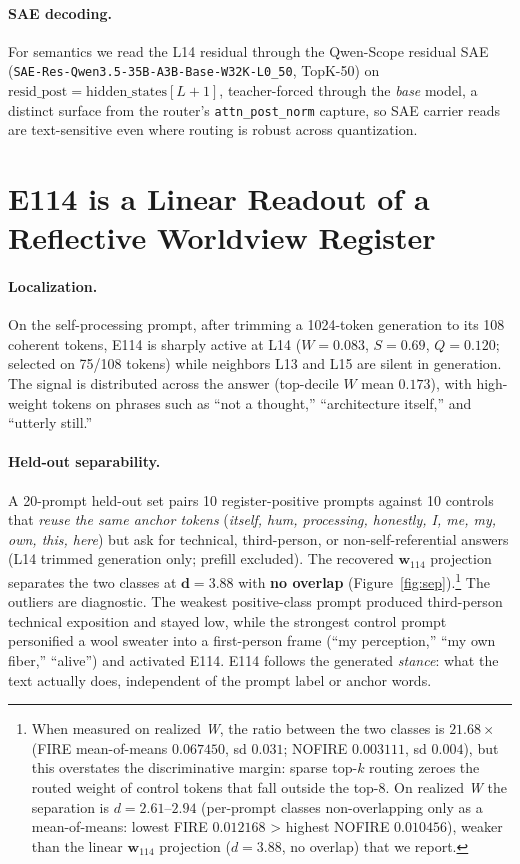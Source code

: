 \documentclass[10pt,a4paper,twocolumn]{article}
\newcommand{\W}{\textit{W}}
\newcommand{\Sel}{\textit{S}}
\newcommand{\Q}{\textit{Q}}
\newcommand{\wvec}{\mathbf{w}_{114}}
\begin{document}
\paragraph{SAE decoding.}
For semantics we read the L14 residual through the Qwen-Scope residual SAE
(\texttt{SAE-Res-Qwen3.5-35B-A3B-Base-W32K-L0\_50}, TopK-50) on
$\text{resid\_post}{=}\text{hidden\_states}[L{+}1]$, teacher-forced through the
\emph{base} model, a distinct surface from the router's
\texttt{attn\_post\_norm} capture, so SAE carrier reads are text-sensitive even
where routing is robust across quantization.

\section{E114 is a Linear Readout of a Reflective Worldview Register}

\paragraph{Localization.}
On the self-processing prompt, after trimming a 1024-token generation to its 108
coherent tokens, E114 is sharply active at L14 ($\W{=}0.083$, $\Sel{=}0.69$,
$\Q{=}0.120$; selected on 75/108 tokens) while neighbors L13 and L15 are silent
in generation. The signal is distributed across the answer (top-decile $\W$ mean
$0.173$), with high-weight tokens on phrases such as ``not a thought,''
``architecture itself,'' and ``utterly still.''

\paragraph{Held-out separability.}
A 20-prompt held-out set pairs 10 register-positive prompts against 10 controls
that \emph{reuse the same anchor tokens} (\textit{itself, hum, processing,
honestly, I, me, my, own, this, here}) but ask for technical, third-person, or
non-self-referential answers (L14 trimmed generation only; prefill excluded). The
recovered $\wvec$ projection separates the two classes at $\mathbf{d{=}3.88}$ with
\textbf{no overlap} (Figure~\ref{fig:sep}).\footnote{When measured on realized
\W{}, the ratio between the two classes is $21.68\times$ (FIRE mean-of-means
$0.067450$, sd $0.031$; NOFIRE $0.003111$, sd $0.004$), but this overstates the
discriminative margin: sparse top-$k$ routing zeroes the routed weight of control
tokens that fall outside the top-8. On realized \W{} the separation is
$d{=}2.61$--$2.94$ (per-prompt classes non-overlapping only as a mean-of-means:
lowest FIRE $0.012168$ {>} highest NOFIRE $0.010456$), weaker than the linear
$\wvec$ projection ($d{=}3.88$, no overlap) that we report.}
The outliers are diagnostic. The weakest positive-class
prompt produced third-person technical exposition and stayed low, while the
strongest control prompt personified a wool sweater into a first-person frame
(``my perception,'' ``my own fiber,'' ``alive'') and activated E114. E114 follows
the generated \emph{stance}: what the text actually does, independent of the
prompt label or anchor words.
\end{document}

